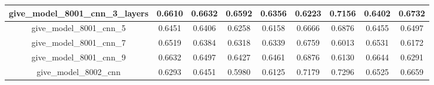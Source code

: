\begin{table}[!h]
\begin{tabular}{|c|c|c|c|c|c|c|c|c|}
        give\_model\_8001\_cnn\_3\_layers & 0.6610                        & 0.6632                         & 0.6592                      & 0.6356                  & 0.6223 & 0.7156 & 0.6402 & 0.6732 \\ \hline
        give\_model\_8001\_cnn\_5         & 0.6451                        & 0.6406                         & 0.6258                      & 0.6158                  & 0.6666 & 0.6876 & 0.6455 & 0.6497 \\ \hline
        give\_model\_8001\_cnn\_7         & 0.6519                        & 0.6384                         & 0.6318                      & 0.6339                  & 0.6759 & 0.6013 & 0.6531 & 0.6172 \\ \hline
        give\_model\_8001\_cnn\_9         & 0.6632                        & 0.6497                         & 0.6427                      & 0.6461                  & 0.6876 & 0.6130 & 0.6644 & 0.6291 \\ \hline
        give\_model\_8002\_cnn            & 0.6293                        & 0.6451                         & 0.5980                      & 0.6125                  & 0.7179 & 0.7296 & 0.6525 & 0.6659 \\ \hline
    \end{tabular}
\end{table}

